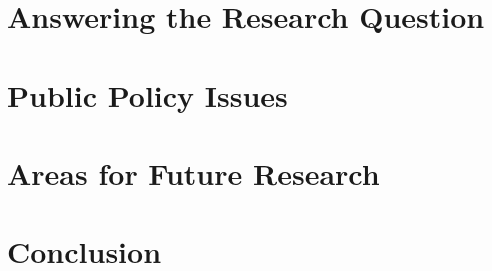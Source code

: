 \section{Answering the Research Question}%
\label{sec:answ-rese-quest}\indent%

\section{Public Policy Issues}%
\label{sec:publ-policy-chang}\indent%

\section{Areas for Future Research}%
\label{sec:issu-future-rese}\indent%

\section{Conclusion}%
\label{sec:conclusion}\indent%


